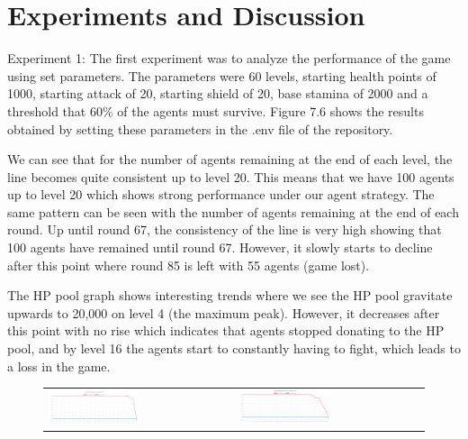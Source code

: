 \section{Experiments and Discussion}


Experiment 1:
The first experiment was to analyze the performance of the game using set parameters. The parameters were 60 levels, starting health points of 1000, starting attack of 20, starting shield of 20, base stamina of 2000 and a threshold that 60\% of the agents must survive.
Figure 7.6 shows the results obtained by setting these parameters in the .env file of the repository. 

We can see that for the number of agents remaining at the end of each level, the line becomes quite consistent up to level 20. This means that we have 100 agents up to level 20 which shows strong performance under our agent strategy. The same pattern can be seen with the number of agents remaining at the end of each round. Up until round 67, the consistency of the line is very high showing that 100 agents have remained until round 67. However, it slowly starts to decline after this point where round 85 is left with 55 agents (game lost). 

The HP pool graph shows interesting trends where we see the HP pool gravitate upwards to 20,000 on level 4 (the maximum peak). However, it decreases after this point with no rise which indicates that agents stopped donating to the HP pool, and by level 16 the agents start to constantly having to fight, which leads to a loss in the game.

\newpage
\begin{figure}[htbp]
\begin{tabular}{ll}
    \centering
    \includegraphics[width=0.5\textwidth]{007_team_4_agent_design/figures/EX1_1.jpg}
    &
    \includegraphics[width=0.5\textwidth]{007_team_4_agent_design/figures/EX1_2.jpg}
\end{tabular}

\end{figure}

